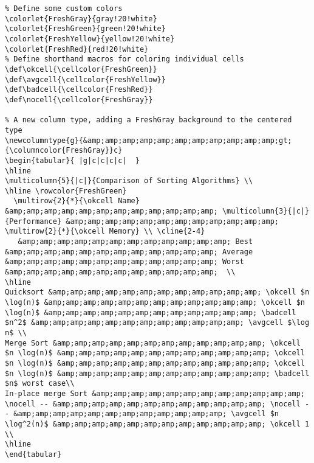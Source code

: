 \begin{lstlisting}
% Define some custom colors
\colorlet{FreshGray}{gray!20!white}
\colorlet{FreshGreen}{green!20!white}
\colorlet{FreshYellow}{yellow!20!white}
\colorlet{FreshRed}{red!20!white}
% Define shorthand macros for coloring individual cells
\def\okcell{\cellcolor{FreshGreen}}
\def\avgcell{\cellcolor{FreshYellow}}
\def\badcell{\cellcolor{FreshRed}}
\def\nocell{\cellcolor{FreshGray}}

% A new column type, adding a FreshGray background to the centered type
\newcolumntype{g}{&amp;amp;amp;amp;amp;amp;amp;amp;amp;amp;amp;gt;{\columncolor{FreshGray}}c}
\begin{tabular}{ |g|c|c|c|c|  }
\hline
\multicolumn{5}{|c|}{Comparison of Sorting Algorithms} \\
\hline \rowcolor{FreshGreen} 
  \multirow{2}{*}{\okcell Name} &amp;amp;amp;amp;amp;amp;amp;amp;amp;amp;amp;amp; \multicolumn{3}{|c|}{Performance} &amp;amp;amp;amp;amp;amp;amp;amp;amp;amp;amp;amp; \multirow{2}{*}{\okcell Memory} \\ \cline{2-4}
   &amp;amp;amp;amp;amp;amp;amp;amp;amp;amp;amp;amp; Best &amp;amp;amp;amp;amp;amp;amp;amp;amp;amp;amp;amp; Average &amp;amp;amp;amp;amp;amp;amp;amp;amp;amp;amp;amp; Worst &amp;amp;amp;amp;amp;amp;amp;amp;amp;amp;amp;amp;  \\
\hline
Quicksort &amp;amp;amp;amp;amp;amp;amp;amp;amp;amp;amp;amp; \okcell $n \log(n)$ &amp;amp;amp;amp;amp;amp;amp;amp;amp;amp;amp;amp; \okcell $n \log(n)$ &amp;amp;amp;amp;amp;amp;amp;amp;amp;amp;amp;amp; \badcell $n^2$ &amp;amp;amp;amp;amp;amp;amp;amp;amp;amp;amp;amp; \avgcell $\log n$ \\
Merge Sort &amp;amp;amp;amp;amp;amp;amp;amp;amp;amp;amp;amp; \okcell $n \log(n)$ &amp;amp;amp;amp;amp;amp;amp;amp;amp;amp;amp;amp; \okcell $n \log(n)$ &amp;amp;amp;amp;amp;amp;amp;amp;amp;amp;amp;amp; \okcell $n \log(n)$ &amp;amp;amp;amp;amp;amp;amp;amp;amp;amp;amp;amp; \badcell $n$ worst case\\
In-place merge Sort &amp;amp;amp;amp;amp;amp;amp;amp;amp;amp;amp;amp; \nocell -- &amp;amp;amp;amp;amp;amp;amp;amp;amp;amp;amp;amp; \nocell -- &amp;amp;amp;amp;amp;amp;amp;amp;amp;amp;amp;amp; \avgcell $n \log^2(n)$ &amp;amp;amp;amp;amp;amp;amp;amp;amp;amp;amp;amp; \okcell 1 \\
\hline
\end{tabular}
\end{lstlisting}

\def\okcell{\cellcolor{FreshGreen}}
\def\avgcell{\cellcolor{FreshYellow}}
\def\badcell{\cellcolor{FreshRed}}
\def\nocell{\cellcolor{FreshGray}}

\begin{table}[h!]
\begin{tabular}{ |g|c|c|c|c|  }
\hline
{} \\
\hline {} 
  \onlyHTML{\multirow{2}{*}{
\end{tabular}
\end{table}